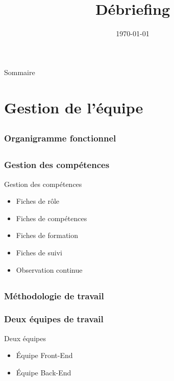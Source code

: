 \documentclass[compress,xcolor=dvipsnames]{beamer}
\title{Débriefing \CP}
\date{\today}
\author{\Sergi}
\institute{\insa}
\begin{document}
\begin{frame}[plain]
	\titlepage
\end{frame}


\begin{frame}{Sommaire}
	\tableofcontents[hideallsubsections]
\end{frame}



\section[Gestion de l'équipe]{Gestion de l'équipe}
\subsection{}
\begin{frame}
\frametitle{Organigramme fonctionnel}
\end{frame}


\subsection{}
\begin{frame}
\frametitle{Gestion des compétences}
\begin{block}{Gestion des compétences}
\begin{itemize}
	\item Fiches de rôle
	\item Fiches de compétences
	\item Fiches de formation
	\item Fiches de suivi
	\item Observation continue
\end{itemize}
\end{block}
\end{frame}


\subsection{}
\begin{frame}
\frametitle{Méthodologie de travail}
\end{frame}

\begin{frame}
\frametitle{Deux équipes de travail}
\begin{block}{Deux équipes}
\begin{itemize}
	\item Équipe Front-End
	\item Équipe Back-End
\end{itemize}
\end{block}
\end{frame}
\end{document}
